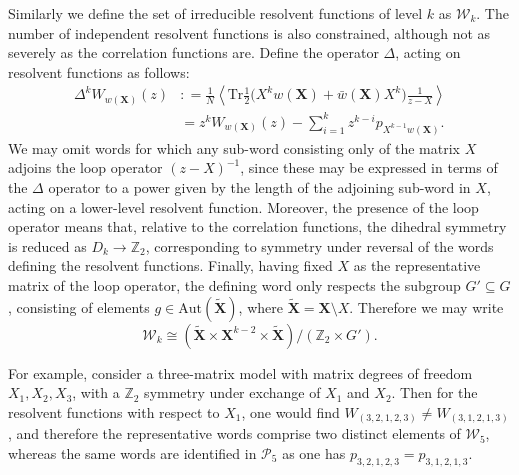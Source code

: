 Similarly we define the set of irreducible resolvent functions of level $k$ as $\mathcal{W}_k$. The
number of independent resolvent functions is also constrained, although not as severely as the
correlation functions are. Define the operator $\Delta$, acting on resolvent functions as follows:
%
\begin{align}
    \label{delta}
    \Delta^k W_{w(\mathbf{X})}(z) & : = \frac{1}{N} \left\langle \text{Tr}\frac{1}{2} \big( X^k w(\mathbf{X}) + \bar{w}(\mathbf{X})X^k\big) \frac{1}{z-X}\right\rangle \\
                                  & = z^k W_{w(\mathbf{X})}(z) - \sum_{i=1}^k z^{k-i} p_{X^{k-1}w(\mathbf{X})}.
\end{align}
%
We may omit words for which any sub-word consisting only of the matrix $X$ adjoins the loop
operator $(z-X)^{-1}$, since these may be expressed in terms of the $\Delta$ operator to a power
given by the length of the adjoining sub-word in $X$, acting on a lower-level resolvent function.
Moreover, the presence of the loop operator means that, relative to the correlation functions, the
dihedral symmetry is reduced as $D_k\rightarrow\mathbb{Z}_2$, corresponding to symmetry under
reversal of the words defining the resolvent functions. Finally, having fixed $X$ as the
representative matrix of the loop operator, the defining word only respects the subgroup
$G'\subseteq G$, consisting of elements $g\in\text{Aut}(\tilde{\mathbf{X}})$, where
$\tilde{\mathbf{X}}=\mathbf{X} \setminus X$. Therefore we may write
%
\begin{equation}
    \label{irreducibleResolvent}
    \mathcal{W}_k \cong (\tilde{\mathbf{X}} \times \mathbf{X}^{k-2} \times \tilde{\mathbf{X}})/(\mathbb{Z}_2 \times G').
\end{equation}

For example, consider a three-matrix model with matrix degrees of freedom $X_1,X_2,X_3$, with a
$\mathbb{Z}_2$ symmetry under exchange of $X_1$ and $X_2$. Then for the resolvent functions with
respect to $X_1$, one would find $ W_{(3,2,1,2,3)} \neq W_{(3,1,2,1,3)}$, and therefore the
representative words comprise two distinct elements of $\mathcal{W}_5$, whereas the same words are
identified in $\mathcal{P}_5$ as one has $p_{3,2,1,2,3} = p_{3,1,2,1,3}$.

